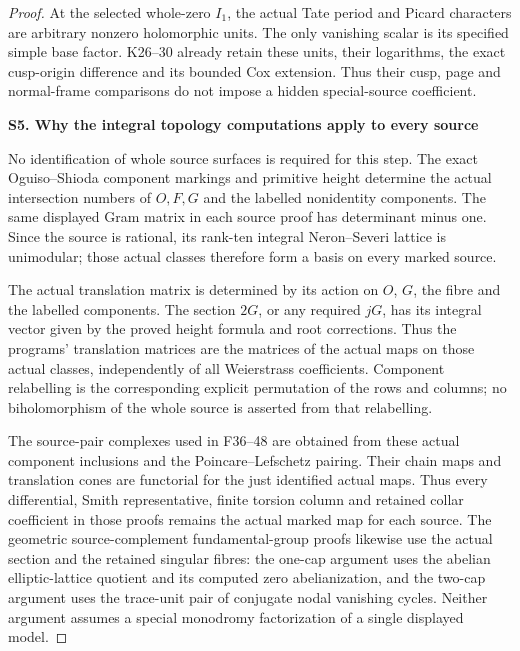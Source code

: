 \begin{proof}
At the selected whole-zero \(I_1\), the actual Tate
period and Picard characters are arbitrary nonzero
holomorphic units. The only vanishing scalar is its
specified simple base factor. K26--30 already retain
these units, their logarithms, the exact cusp-origin
difference and its bounded Cox extension. Thus their
cusp, page and normal-frame comparisons do not impose
a hidden special-source coefficient.

\par

\medskip\noindent\textbf{S5. Why the integral topology computations apply to every source}

\par\nobreak

No identification of whole source surfaces is required
for this step. The exact Oguiso--Shioda component
markings and primitive height determine the actual
intersection numbers of \(O,F,G\) and the labelled
nonidentity components. The same displayed Gram matrix
in each source proof has determinant minus one. Since
the source is rational, its rank-ten integral
Neron--Severi lattice is unimodular; those actual
classes therefore form a basis on every marked source.

The actual translation matrix is determined by its
action on \(O\), \(G\), the fibre and the labelled
components. The section \(2G\), or any required \(jG\),
has its integral vector given by the proved height
formula and root corrections. Thus the programs'
translation matrices are the matrices of the actual
maps on those actual classes, independently of all
Weierstrass coefficients. Component relabelling is
the corresponding explicit permutation of the rows
and columns; no biholomorphism of the whole source
is asserted from that relabelling.

The source-pair complexes used in F36--48 are obtained
from these actual component inclusions and the
Poincare--Lefschetz pairing. Their chain maps and
translation cones are functorial for the just
identified actual maps. Thus every differential,
Smith representative, finite torsion column and
retained collar coefficient in those proofs remains
the actual marked map for each source. The geometric
source-complement fundamental-group proofs likewise
use the actual section and the retained singular
fibres: the one-cap argument uses the abelian
elliptic-lattice quotient and its computed zero
abelianization, and the two-cap argument uses the
trace-unit pair of conjugate nodal vanishing cycles.
Neither argument assumes a special monodromy
factorization of a single displayed model.


\end{proof}
